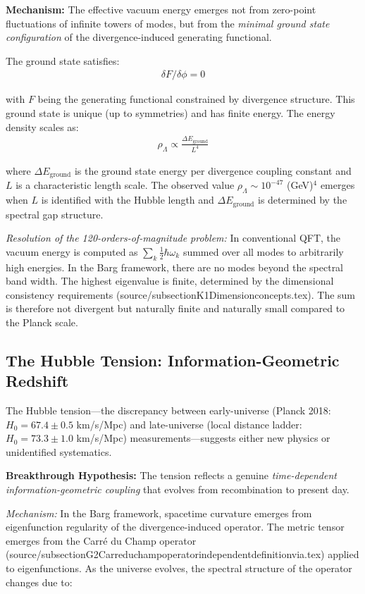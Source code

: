 \documentclass[12pt,a4paper]{article}
\begin{document}
\textbf{Mechanism:} The effective vacuum energy emerges not from zero-point fluctuations of infinite towers of modes, but from the \textit{minimal ground state configuration} of the divergence-induced generating functional.

The ground state satisfies:
\begin{align}
\delta F/\delta \phi = 0
\end{align}

with $F$ being the generating functional constrained by divergence structure. This ground state is unique (up to symmetries) and has finite energy. The energy density scales as:
\begin{align}
\rho_\Lambda \propto \frac{\Delta E_{\text{ground}}}{L^4}
\end{align}

where $\Delta E_{\text{ground}}$ is the ground state energy per divergence coupling constant and $L$ is a characteristic length scale. The observed value $\rho_\Lambda \sim 10^{-47}$ (GeV)$^4$ emerges when $L$ is identified with the Hubble length and $\Delta E_{\text{ground}}$ is determined by the spectral gap structure.

\textit{Resolution of the 120-orders-of-magnitude problem:} In conventional QFT, the vacuum energy is computed as $\sum_k \frac{1}{2}\hbar\omega_k$ summed over all modes to arbitrarily high energies. In the Barg framework, there are no modes beyond the spectral band width. The highest eigenvalue is finite, determined by the dimensional consistency requirements (source/subsectionK1Dimensionconcepts.tex). The sum is therefore not divergent but naturally finite and naturally small compared to the Planck scale.

\subsection{The Hubble Tension: Information-Geometric Redshift}

The Hubble tension---the discrepancy between early-universe (Planck 2018: $H_0 = 67.4 \pm 0.5$ km/s/Mpc) and late-universe (local distance ladder: $H_0 = 73.3 \pm 1.0$ km/s/Mpc) measurements---suggests either new physics or unidentified systematics.

\textbf{Breakthrough Hypothesis:} The tension reflects a genuine \textit{time-dependent information-geometric coupling} that evolves from recombination to present day.

\textit{Mechanism:} In the Barg framework, spacetime curvature emerges from eigenfunction regularity of the divergence-induced operator. The metric tensor emerges from the Carré du Champ operator (source/subsectionG2Carreduchampoperatorindependentdefinitionvia.tex) applied to eigenfunctions. As the universe evolves, the spectral structure of the operator changes due to:
\end{document}
